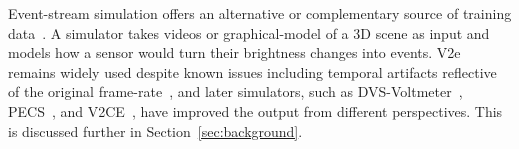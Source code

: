 Event-stream simulation offers an alternative or complementary source of training data~\cite{hu2021v2e,lin2022dvsvoltmeter}. A simulator takes videos or graphical-model of a 3D scene as input and models how a sensor would turn their brightness changes into events. V2e remains widely used despite known issues including temporal artifacts reflective of the original frame-rate~\cite{hu2021v2e}, and later simulators, such as DVS-Voltmeter~\cite{lin2022dvsvoltmeter}, PECS~\cite{han2024pecs}, and V2CE~\cite{zhang2024v2ce}, have improved the output from different perspectives. This is discussed further in Section~\ref{sec:background}.  



